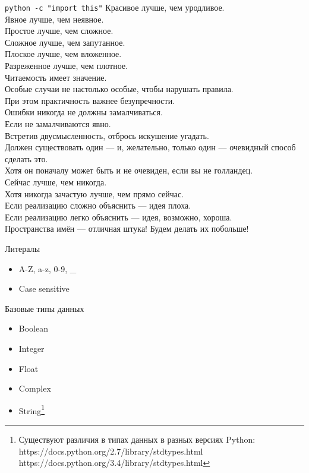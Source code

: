 \documentclass[hyperref={pdftex,unicode}]{beamer}
\begin{document}
\begin{frame}{\texttt{python -c "import this"}}
\footnotesize{
Красивое лучше, чем уродливое. \\
Явное лучше, чем неявное. \\
Простое лучше, чем сложное. \\
Сложное лучше, чем запутанное. \\
Плоское лучше, чем вложенное. \\
Разреженное лучше, чем плотное. \\
Читаемость имеет значение. \\
Особые случаи не настолько особые, чтобы нарушать правила. \\
При этом практичность важнее безупречности. \\
Ошибки никогда не должны замалчиваться. \\
Если не замалчиваются явно. \\
Встретив двусмысленность, отбрось искушение угадать. \\
Должен существовать один --- и, желательно, 
только один — очевидный способ сделать это. \\
Хотя он поначалу может быть и не очевиден, если вы не голландец. \\
Сейчас лучше, чем никогда. \\
Хотя никогда зачастую лучше, чем прямо сейчас. \\
Если реализацию сложно объяснить --- идея плоха. \\
Если реализацию легко объяснить --- идея, возможно, хороша. \\
Пространства имён — отличная штука! Будем делать их побольше!
}
\end{frame}

\begin{frame}{Литералы}
  \begin{itemize}
    \item A-Z, a-z, 0-9, \_
    \item Case sensitive
  \end{itemize}
\end{frame}

\begin{frame}{Базовые типы данных}
  \begin{itemize}
    \item Boolean
    \item Integer
    \item Float
    \item Complex
    \item String\footnote[frame]{
        Существуют различия в типах данных в разных версиях Python: \\
        https://docs.python.org/2.7/library/stdtypes.html \\
        https://docs.python.org/3.4/library/stdtypes.html}
  \end{itemize}
\end{frame}
\end{document}
